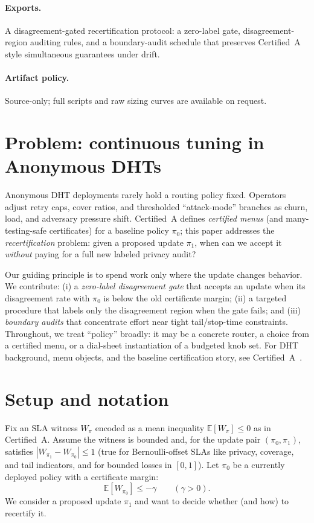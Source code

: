 \documentclass[11pt]{article}
\begin{document}
\paragraph{Exports.}
A disagreement-gated recertification protocol: a zero-label gate, disagreement-region auditing rules, and a boundary-audit schedule that preserves Certified~A style simultaneous guarantees under drift.

\paragraph{Artifact policy.}
Source-only; full scripts and raw sizing curves are available on request.\cite{series:artifactpolicy}

\section{Problem: continuous tuning in Anonymous DHTs}
Anonymous DHT deployments rarely hold a routing policy fixed.
Operators adjust retry caps, cover ratios, and thresholded ``attack-mode'' branches as churn, load, and adversary pressure shift.
Certified~A defines \emph{certified menus} (and many-testing-safe certificates) for a baseline policy $\pi_0$; this paper addresses the \emph{recertification} problem:
given a proposed update $\pi_1$, when can we accept it \emph{without} paying for a full new labeled privacy audit?

Our guiding principle is to spend work only where the update changes behavior.
We contribute:
(i) a \emph{zero-label disagreement gate} that accepts an update when its disagreement rate with $\pi_0$ is below the old certificate margin;
(ii) a targeted procedure that labels only the disagreement region when the gate fails; and
(iii) \emph{boundary audits} that concentrate effort near tight tail/stop-time constraints.
Throughout, we treat ``policy'' broadly: it may be a concrete router, a choice from a certified menu, or a dial-sheet instantiation of a budgeted knob set.
For DHT background, menu objects, and the baseline certification story, see Certified~A~\cite{series:menus}.

\section{Setup and notation}
Fix an SLA witness $W_\pi$ encoded as a mean inequality $\mathbb{E}[W_\pi]\le 0$ as in Certified~A.
Assume the witness is bounded and, for the update pair $(\pi_0,\pi_1)$, satisfies $|W_{\pi_1}-W_{\pi_0}|\le 1$ (true for Bernoulli-offset SLAs like privacy, coverage, and tail indicators, and for bounded losses in $[0,1]$).
Let $\pi_0$ be a currently deployed policy with a certificate margin:
\begin{equation}
\mathbb{E}[W_{\pi_0}] \le -\gamma
\qquad (\gamma>0).
\label{eq:margin}
\end{equation}
We consider a proposed update $\pi_1$ and want to decide whether (and how) to recertify it.
\end{document}
